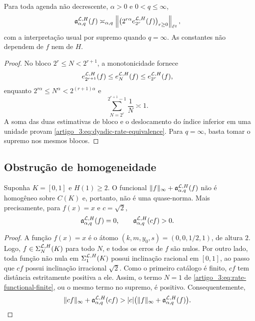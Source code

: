 \begin{theorem}\label{map:artigo_3:3.2}
\label{artigo_3:thm:dyadic-rate-equivalence}
Para toda agenda não decrescente, $\alpha>0$ e $0<q\le\infty$,
\begin{equation}
 \mathfrak a_{\alpha,q}^{\mathcal{L},H}(f)
 \asymp_{\alpha,q}
 \left\|\bigl(2^{r\alpha}
 e_{2^r}^{\mathcal{L},H}(f)\bigr)_{r\ge0}\right\|_{\ell^q},
 \label{artigo_3:eq:dyadic-rate-equivalence}
\end{equation}
com a interpretação usual por supremo quando $q=\infty$. As constantes não
dependem de $f$ nem de $H$.
\end{theorem}

\begin{proof}
No bloco $2^r\le N<2^{r+1}$, a monotonicidade fornece
\[
 e_{2^{r+1}}^{\mathcal{L},H}(f)
 \le e_N^{\mathcal{L},H}(f)
 \le e_{2^r}^{\mathcal{L},H}(f),
\]
enquanto $2^{r\alpha}\le N^\alpha<2^{(r+1)\alpha}$ e
\[
 \sum_{N=2^r}^{2^{r+1}-1}\frac1N\asymp1.
\]
A soma das duas estimativas de bloco e o deslocamento do índice inferior em uma
unidade provam \eqref{artigo_3:eq:dyadic-rate-equivalence}. Para $q=\infty$, basta
tomar o supremo nos mesmos blocos.
\end{proof}

\subsection{Obstrução de homogeneidade}

\begin{proposition}\label{map:artigo_3:3.3}
\label{artigo_3:prop:nonhomogeneous-functional}
Suponha $K=[0,1]$ e $H(1)\ge2$. O funcional
$\|f\|_\infty+\mathfrak a_{\alpha,q}^{\mathcal{L},H}(f)$ não é homogêneo sobre
$C(K)$ e, portanto, não é uma quase-norma. Mais precisamente, para
$f(x)=x$ e $c=\sqrt2$,
\begin{equation}
 \mathfrak a_{\alpha,q}^{\mathcal{L},H}(f)=0,
 \qquad
 \mathfrak a_{\alpha,q}^{\mathcal{L},H}(cf)>0.
 \label{artigo_3:eq:nonhomogeneous-certificate}
\end{equation}
\end{proposition}

\begin{proof}
A função $f(x)=x$ é o átomo $(k,m,y_0,s)=(0,0,1/2,1)$, de altura $2$.
Logo, $f\in\Sigma_N^{\mathcal{L},H}(K)$ para todo $N$, e todos os erros de
$f$ são nulos. Por outro lado, toda função não nula em
$\Sigma_1^{\mathcal{L},H}(K)$ possui inclinação racional em $[0,1]$, ao passo que
$cf$ possui inclinação irracional $\sqrt2$. Como o primeiro catálogo é
finito, $cf$ tem distância estritamente positiva a ele. Assim, o termo
$N=1$ de \eqref{artigo_3:eq:rate-functional-finite}, ou o mesmo termo no supremo,
é positivo. Consequentemente,
\[
 \|cf\|_\infty+\mathfrak a_{\alpha,q}^{\mathcal{L},H}(cf)
 >|c|\bigl(\|f\|_\infty+
 \mathfrak a_{\alpha,q}^{\mathcal{L},H}(f)\bigr).
\]
\end{proof}


